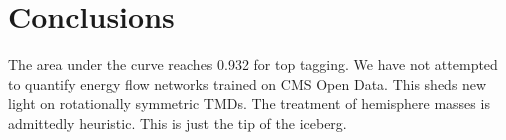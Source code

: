 \section{Conclusions}\label{sec:conclusions}

The area under the curve reaches 0.932 for top tagging. We have not
attempted to quantify energy flow networks trained on CMS Open Data.
This sheds new light on rotationally symmetric TMDs. The treatment of
hemisphere masses is admittedly heuristic. This is just the tip of the
iceberg.

